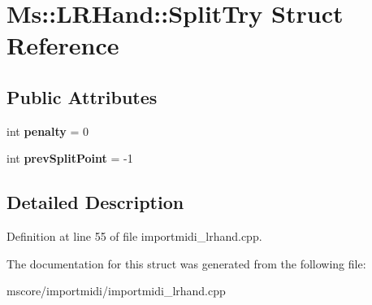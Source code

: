 \hypertarget{struct_ms_1_1_l_r_hand_1_1_split_try}{}\section{Ms\+:\+:L\+R\+Hand\+:\+:Split\+Try Struct Reference}
\label{struct_ms_1_1_l_r_hand_1_1_split_try}
\subsection*{Public Attributes}
\begin{DoxyCompactItemize}
\item 
\mbox{\label{struct_ms_1_1_l_r_hand_1_1_split_try_a613e12a467ce7694928ce05ee6ef5dfc}} 
int {\bfseries penalty} = 0
\item 
\mbox{\label{struct_ms_1_1_l_r_hand_1_1_split_try_a337e714d34803b131686ee4f72e30754}} 
int {\bfseries prev\+Split\+Point} = -\/1
\end{DoxyCompactItemize}


\subsection{Detailed Description}


Definition at line 55 of file importmidi\+\_\+lrhand.\+cpp.



The documentation for this struct was generated from the following file\+:\begin{DoxyCompactItemize}
\item 
mscore/importmidi/importmidi\+\_\+lrhand.\+cpp\end{DoxyCompactItemize}
